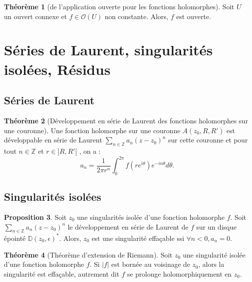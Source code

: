 \documentclass[11pt,a4paper]{article}
\newcommand{\Z}{\mathbb{Z}}
\newcommand{\D}{\mathbb{D}}
\theoremstyle{definition}
\newtheorem{theoreme}{Th\'eor\`eme}[section]
\newtheorem{proposition}[theoreme]{Proposition}
\theoremstyle{plain}
\begin{document}
\begin{theoreme}[de l'application ouverte pour les fonctions holomorphes]
Soit $U$ un ouvert connexe et $f\in \mathcal O(U)$ non constante.
Alors, $f$ est ouverte.
\end{theoreme}









\section{Séries de Laurent, singularités isolées, Résidus}

\subsection{Séries de Laurent}



\begin{theoreme}[Développement en série de Laurent des fonctions holomorphes sur une couronne]
Une fonction holomorphe sur une couronne $A(z_0,R,R')$ est développable en série de Laurent $\sum_{n\in\Z} a_n(z-z_0)^n$ sur cette couronne et pour tout $n\in\Z$ et $r \in ]R,R'[$ , on a :
\[a_n = \frac{1}{2\pi r^n}\int_0^{2\pi}f\left(re^{i\theta}\right)e^{-in\theta}d\theta. \]
\end{theoreme}



\subsection{Singularités isolées}



\begin{proposition}
Soit $z_0$ une singularités isolée d'une fonction holomorphe $f$.
Soit $\sum_{n\in \Z} a_n(z-z_0)^n$ le développement en série de Laurent de $f$ sur un disque épointé $\D(z_0,\epsilon)^*$.
Alors, $z_0$ est une singularité effaçable ssi $\forall n<0, a_n=0$.
\end{proposition}


\begin{theoreme}[Théorème d'extension de Riemann]
Soit $z_0$ une singularité isolée d'une fonction holomorphe $f$.
Si $|f|$ est bornée au voisinage de $z_0$, alors la singularité est effaçable, autrement dit $f$ se prolonge holomorphiquement en $z_0$.
\end{theoreme}
\end{document}
